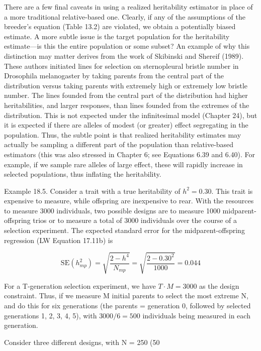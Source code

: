 \documentclass{article}
\begin{document}
There are a few final caveats in using a realized heritability estimator in place of a more traditional relative-based one. Clearly, if any of the assumptions of the breeder's equation (Table 13.2) are violated, we obtain a potentially biased estimate. A more subtle issue is the target population for the heritability estimate—is this the entire population or some subset? An example of why this distinction may matter derives from the work of Skibinski and Shereif (1989). These authors initiated lines for selection on sternopleural bristle number in Drosophila melanogaster by taking parents from the central part of the distribution versus taking parents with extremely high or extremely low bristle number. The lines founded from the central part of the distribution had higher heritabilities, and larger responses, than lines founded from the extremes of the distribution. This is not expected under the infinitesimal model (Chapter 24), but it is expected if there are alleles of modest (or greater) effect segregating in the population. Thus, the subtle point is that realized heritability estimates may actually be sampling a different part of the population than relative-based estimators (this was also stressed in Chapter 6; see Equations 6.39 and 6.40). For example, if we sample rare alleles of large effect, these will rapidly increase in selected populations, thus inflating the heritability.

Example 18.5. Consider a trait with a true heritability of  $ h^2 = 0.30 $. This trait is expensive to measure, while offspring are inexpensive to rear. With the resources to measure 3000 individuals, two possible designs are to measure 1000 midparent-offspring trios or to measure a total of 3000 individuals over the course of a selection experiment. The expected standard error for the midparent-offspring regression (LW Equation 17.11b) is

\begin{equation}
\mathrm{SE}(h_{mp}^{2})=\sqrt{\frac{2-h^{4}}{N_{mp}}}=\sqrt{\frac{2-0.30^{2}}{1000}}=0.044
\end{equation}

For a T-generation selection experiment, we have  $ T \cdot M = 3000 $ as the design constraint. Thus, if we measure M initial parents to select the most extreme N, and do this for six generations (the parents = generation 0, followed by selected generations 1, 2, 3, 4, 5), with  $ 3000/6 = 500 $ individuals being measured in each generation.

Consider three different designs, with N = 250 (50%
\end{document}
